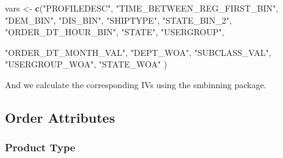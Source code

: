 \documentclass[
]{article}
\newenvironment{Shaded}{\begin{snugshade}}{\end{snugshade}}
\newcommand{\CommentTok}[1]{\textcolor[rgb]{0.56,0.35,0.01}{\textit{#1}}}
\newcommand{\ControlFlowTok}[1]{\textcolor[rgb]{0.13,0.29,0.53}{\textbf{#1}}}
\newcommand{\DataTypeTok}[1]{\textcolor[rgb]{0.13,0.29,0.53}{#1}}
\newcommand{\KeywordTok}[1]{\textcolor[rgb]{0.13,0.29,0.53}{\textbf{#1}}}
\newcommand{\NormalTok}[1]{#1}
\newcommand{\StringTok}[1]{\textcolor[rgb]{0.31,0.60,0.02}{#1}}
\begin{document}
\begin{Shaded}
\begin{Highlighting}[]
\NormalTok{vars <-}\StringTok{ }\KeywordTok{c}\NormalTok{(}\StringTok{"PROFILEDESC"}\NormalTok{, }
          \StringTok{"TIME_BETWEEN_REG_FIRST_BIN"}\NormalTok{, }
          \StringTok{"DEM_BIN"}\NormalTok{, }
          \StringTok{"DIS_BIN"}\NormalTok{, }
          \StringTok{"SHIPTYPE"}\NormalTok{, }
          \StringTok{"STATE_BIN_2"}\NormalTok{, }
          \StringTok{"ORDER_DT_HOUR_BIN"}\NormalTok{,}
          \StringTok{"STATE"}\NormalTok{,}
          \StringTok{"USERGROUP"}\NormalTok{,}
          
          \StringTok{"ORDER_DT_MONTH_VAL"}\NormalTok{, }
          \StringTok{"DEPT_WOA"}\NormalTok{, }
          \StringTok{"SUBCLASS_VAL"}\NormalTok{,}
          \StringTok{"USERGROUP_WOA"}\NormalTok{,}
          \StringTok{"STATE_WOA"}
\NormalTok{)}
\end{Highlighting}
\end{Shaded}

And we calculate the corresponding IVs using the smbinning package.

\begin{Shaded}
\end{Shaded}

\pagebreak

\hypertarget{order-attributes}{%
\subsection{Order Attributes}\label{order-attributes}}

\hypertarget{product-type}{%
\subsubsection{Product Type}\label{product-type}}
\end{document}
